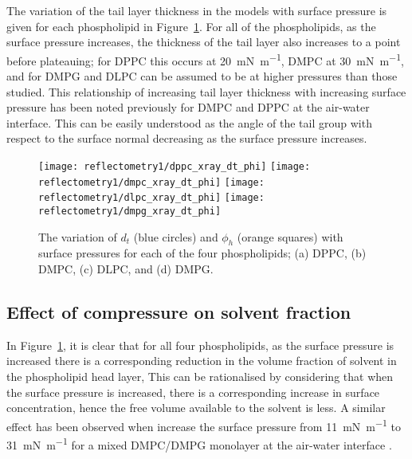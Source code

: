 The variation of the tail layer thickness in the models with surface pressure is given for each phospholipid in Figure~\ref{fig:dtphi}.
For all of the phospholipids, as the surface pressure increases, the thickness of the tail layer also increases to a point before plateauing; for DPPC this occurs at \SI{20}{\milli\newton\per\meter}, DMPC at \SI{30}{\milli\newton\per\meter}, and for DMPG and DLPC can be assumed to be at higher pressures than those studied.
This relationship of increasing tail layer thickness with increasing surface pressure has been noted previously for DMPC \cite{bayerl_specular_1990} and DPPC \cite{campbell_structure_2018} at the air-water interface.
This can be easily understood as the angle of the tail group with respect to the surface normal decreasing as the surface pressure increases.
%
\begin{figure}
    \centering
    \texttt{[image: reflectometry1/dppc\_xray\_dt\_phi]}
    \texttt{[image: reflectometry1/dmpc\_xray\_dt\_phi]}
    \texttt{[image: reflectometry1/dlpc\_xray\_dt\_phi]}
    \texttt{[image: reflectometry1/dmpg\_xray\_dt\_phi]}
    \caption{The variation of $d_t$ (blue circles) and $\phi_h$ (orange squares) with surface pressures for each of the four phospholipids; (a) DPPC, (b) DMPC, (c) DLPC, and (d) DMPG.}
    \label{fig:dtphi}
\end{figure}
%

\subsection{Effect of compressure on solvent fraction}
In Figure~\ref{fig:dtphi}, it is clear that for all four phospholipids, as the surface pressure is increased there is a corresponding reduction in the volume fraction of solvent in the phospholipid head layer,
This can be rationalised by considering that when the surface pressure is increased, there is a corresponding increase in surface concentration, hence the free volume available to the solvent is less.
A similar effect has been observed when increase the surface pressure from \SI{11}{\milli\newton\per\meter} to \SI{31}{\milli\newton\per\meter} for a mixed DMPC/DMPG monolayer at the air-water interface \cite{bayerl_specular_1990}.

